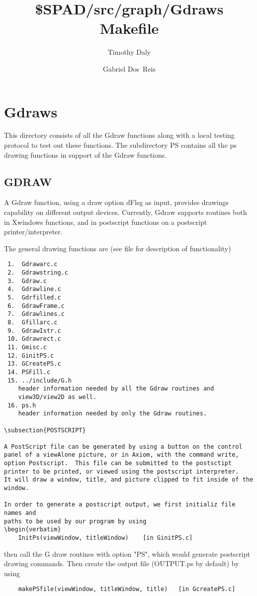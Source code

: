 \documentclass{article}
\title{\$SPAD/src/graph/Gdraws Makefile}
\author{Timothy Daly \and Gabriel Dos~Reis}
\begin{document}
\maketitle

\begin{abstract}
\end{abstract}
\eject

\tableofcontents
\eject

\section{Gdraws}

This directory consists of all the Gdraw functions along with a local
testing protocol to test out these functions.
The subdirectory PS contains all the ps drawing functions in support of
the Gdraw functions.

\subsection{GDRAW}

A Gdraw function, using a draw option dFlsg as input, provides drawings
capability on different output devices.  Currently, Gdraw supports routines
both in Xwindows functions, and in postscript functions on
a postscript printer/interpreter.

The general drawing functions are (see file for description of functionality)
\begin{verbatim}
 1.  Gdrawarc.c
 2.  Gdrawstring.c
 3.  Gdraw.c
 4.  Gdrawline.c
 5.  Gdrfilled.c
 6.  GdrawFrame.c
 7.  Gdrawlines.c
 8.  Gfillarc.c
 9.  GdrawIstr.c
 10. Gdrawrect.c
 11. Gmisc.c
 12. GinitPS.c
 13. GCreatePS.c
 14. PSFill.c
 15. ../include/G.h
    header information needed by all the Gdraw routines and
    view3D/view2D as well.
 16. ps.h
    header information needed by only the Gdraw routines.

\subsection{POSTSCRIPT}

A PostScript file can be generated by using a button on the control
panel of a viewAlone picture, or in Axiom, with the command write,
option Postscript.  This file can be submitted to the postsctipt
printer to be printed, or viewed using the postscript interpreter.
It will draw a window, title, and picture clipped to fit inside of the
window.

In order to generate a postscript output, we first initializ file names and
paths to be used by our program by using
\begin{verbatim}
	InitPs(viewWindow, titleWindow)    [in GinitPS.c]
\end{verbatim}
then call the G draw routines with option "PS", which would generate postscript
drawing commands.  Then create the output file (OUTPUT.ps by default) by using
\begin{verbatim}
	makePSfile(viewWindow, titleWindow, title)   [in GcreatePS.c]
\end{verbatim}
\end{document}
